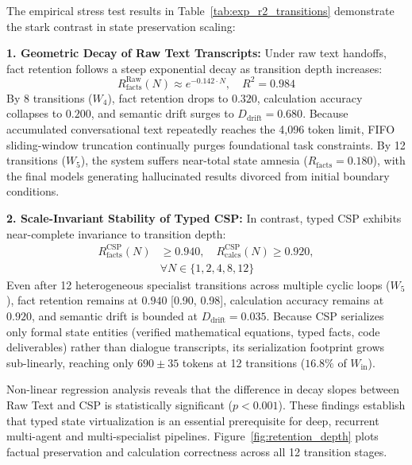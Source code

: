 The empirical stress test results in Table~\ref{tab:exp_r2_transitions} demonstrate the stark contrast in state preservation scaling:

\textbf{1. Geometric Decay of Raw Text Transcripts:} Under raw text handoffs, fact retention follows a steep exponential decay as transition depth increases:
\begin{equation}
R_{\text{facts}}^{\text{Raw}}(N) \approx e^{-0.142 \cdot N}, \quad R^2 = 0.984
\end{equation}
By 8 transitions ($W_4$), fact retention drops to $0.320$, calculation accuracy collapses to $0.200$, and semantic drift surges to $D_{\text{drift}} = 0.680$. Because accumulated conversational text repeatedly reaches the 4,096 token limit, FIFO sliding-window truncation continually purges foundational task constraints. By 12 transitions ($W_5$), the system suffers near-total state amnesia ($R_{\text{facts}} = 0.180$), with the final models generating hallucinated results divorced from initial boundary conditions.

\textbf{2. Scale-Invariant Stability of Typed CSP:} In contrast, typed CSP exhibits near-complete invariance to transition depth:
\begin{equation}
\begin{aligned}
R_{\text{facts}}^{\text{CSP}}(N) &\ge 0.940, \quad R_{\text{calcs}}^{\text{CSP}}(N) \ge 0.920, \\
&\forall N \in \{1, 2, 4, 8, 12\}
\end{aligned}
\end{equation}
Even after 12 heterogeneous specialist transitions across multiple cyclic loops ($W_5$), fact retention remains at $0.940$ [0.90, 0.98], calculation accuracy remains at $0.920$, and semantic drift is bounded at $D_{\text{drift}} = 0.035$. Because CSP serializes only formal state entities (verified mathematical equations, typed facts, code deliverables) rather than dialogue transcripts, its serialization footprint grows sub-linearly, reaching only $690 \pm 35$ tokens at 12 transitions ($16.8\%$ of $W_{\text{in}}$).

Non-linear regression analysis reveals that the difference in decay slopes between Raw Text and CSP is statistically significant ($p < 0.001$). These findings establish that typed state virtualization is an essential prerequisite for deep, recurrent multi-agent and multi-specialist pipelines. Figure~\ref{fig:retention_depth} plots factual preservation and calculation correctness across all 12 transition stages.

